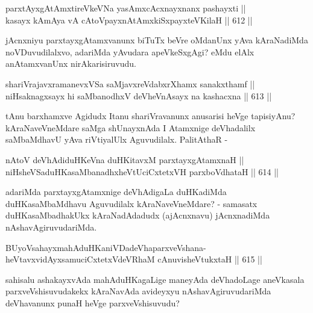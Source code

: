 
\begin{shl}
parxtAyxgAtAmxtireVkeVNa yasAmxcAcxnayxnanx pashayxti || \\
kasayx kAmAya vA cAtoV\s payxnAtAmx\s \s kiSxpayxteV\s KilaH \hfill || 612 ||  
\end{shl}

\begin{artha}
jAcnxniyu parxtayxgAtamxvanunx biTuTx beVre oMdanUnx yAva kAraNadiMda noVDuvudilalxvo, adariMda yAvudara apeVkeSxgAgi? eMdu elAlx anAtamxvanUnx nirAkarisiruvudu.
\end{artha}


\begin{shl}
shariVrajavxramanevxVSa saMjavxreVdabxrXhamx sanakxthamf || \\
niHsaknagxsayx hi saMbanodhxV deVheVnAsayx na kashacxna \hfill || 613 ||  
\end{shl}

\begin{artha}
tAnu barxhamxve Agidudx Itanu shariVravanunx anusarisi heVge tapisiyAnu? kAraNaveVneMdare saMga shUnayxnAda I Atamxnige deVhadalilx saMbaMdhavU yAva riVtiyalUlx Aguvudilalx. PalitAthaR -
\end{artha}

\begin{shl}
nAtoV deVhAdiduHKeVna duHKitavxM parxtayxgAtamxnaH || \\
niHsheVSaduHKasaMbanadhxheVtUciCxtetxVH parxboVdhataH \hfill || 614 ||  
\end{shl}

\begin{artha}
adariMda parxtayxgAtamxnige deVhAdigaLa duHKadiMda duHKa\break saMbaMdhavu Aguvudilalx kAraNaveVneMdare? - samasatx duHKa\break saMbadhakUkx kAraNadAdadudx (ajAcnxnavu) jAcnxnadiMda nAshavAgiruvudariMda.
\end{artha}


\begin{shl}
BUyoV\s sahayxmahAduHKaniVDadeVhaparxveVshana- \\
heVtavxvidAyxsamuciCxtetxVdeVRhaM cAnuvisheVtukxtaH \hfill || 615 ||  
\end{shl}

\begin{artha}
sahisalu ashakayxvAda mahAduHKagaLige maneyAda deVhadoLage aneVkasala parxveVshisuvudakekx kAraNavAda avideyxyu nAshavAgiruvudariMda deVhavanunx punaH heVge parxveVshisuvudu?
\end{artha}

